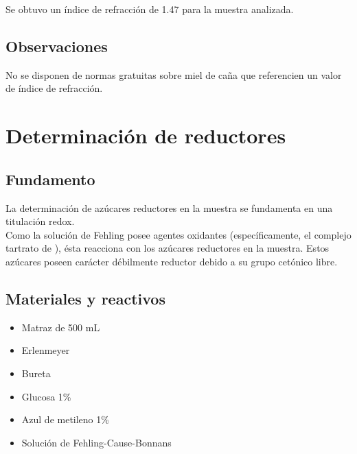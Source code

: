 \documentclass[a4paper,12pt]{article} %
\begin{document}
Se obtuvo un índice de refracción de 1.47 para la muestra analizada.

\subsection{Observaciones}
No se disponen de normas gratuitas sobre miel de caña que referencien un valor de índice de refracción.




\section{Determinación de reductores}
\subsection{Fundamento}
La determinación de azúcares reductores en la muestra se fundamenta en una titulación redox. \\

Como la solución de Fehling posee agentes oxidantes (específicamente, el complejo tartrato de ), ésta reacciona con los azúcares reductores en la muestra. Estos azúcares poseen carácter débilmente reductor debido a su grupo cetónico libre.

\subsection{Materiales y reactivos}
\begin{itemize}
    \item Matraz de 500 mL
    \item Erlenmeyer
    \item Bureta
    \item Glucosa 1\%
    \item Azul de metileno 1\%
    \item Solución de Fehling-Cause-Bonnans
\end{itemize}
\end{document}
